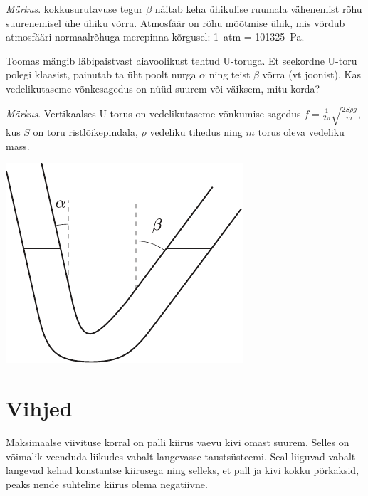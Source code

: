\documentclass[10pt, twoside]{article}
\begin{document}
{\emph{Märkus}. kokkusurutavuse tegur $\beta$ näitab keha ühikulise ruumala vähenemist rõhu suurenemisel ühe ühiku võrra. Atmosfäär on rõhu mõõtmise ühik, mis võrdub atmosfääri normaalrõhuga merepinna kõrgusel: \SI{1}{atm} = \SI{101325}{Pa}.
\probend
\bigskip


Toomas mängib läbipaistvast aiavoolikust tehtud U-toruga. Et seekordne U-toru polegi klaasist, painutab ta üht poolt nurga $\alpha$ ning teist $\beta$ võrra (vt joonist). Kas vedelikutaseme võnkesagedus on nüüd suurem või väiksem, mitu korda? 

\emph{Märkus}. Vertikaalses U-torus on vedelikutaseme võnkumise sagedus $f = \frac{1}{2\pi} \sqrt{\frac{2S\rho g}{m}}$, kus $S$ on toru ristlõikepindala, $\rho$ vedeliku tihedus ning $m$ torus oleva vedeliku mass.

\begin{center}
	\includegraphics[width=0.5\linewidth]{2008-v3g-08-yl}
\end{center}
\probend
\bigskip
\newpage\normalsize\section{Vihjed}
        \toggleHint
        

\hint
Maksimaalse viivituse korral on palli kiirus vaevu kivi omast suurem. Selles on võimalik veenduda liikudes vabalt langevasse taustsüsteemi. Seal liiguvad vabalt langevad kehad konstantse kiirusega ning selleks, et pall ja kivi kokku põrkaksid, peaks nende suhteline kiirus olema negatiivne.
\probend
\bigskip


}
\end{document}
